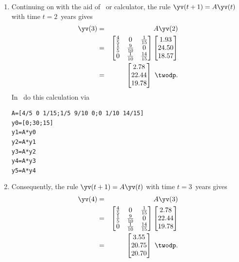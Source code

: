 \begin{example}[orangutans]
\begin{solution}
\begin{enumerate}
\item Continuing on with the aid of \script\ or calculator, the rule \(\yv(t+1)=A\yv(t)\) with time \(t=2\)~years gives
\begin{eqnarray*}
\yv(3)&=&A\yv(2)
\\&=&\begin{bmatrix} \frac45&0&\frac1{15}
\\\frac15&\frac9{10}&0
\\0&\frac1{10}&\frac{14}{15} \end{bmatrix}
\begin{bmatrix} 1.93\\24.50\\18.57 \end{bmatrix}
\\&=&\begin{bmatrix} 2.78\\22.44\\19.78 \end{bmatrix}\ \twodp.
\end{eqnarray*}
In \script\ do this calculation via
\begin{verbatim}
A=[4/5 0 1/15;1/5 9/10 0;0 1/10 14/15]
y0=[0;30;15]
y1=A*y0
y2=A*y1
y3=A*y2
y4=A*y3
y5=A*y4
\end{verbatim}
\setbox\ajrqrbox\hbox{}%
\marginajrbox%

\item Consequently, the rule \(\yv(t+1)=A\yv(t)\) with time \(t=3\)~years gives
\begin{eqnarray*}
\yv(4)&=&A\yv(3)
\\&=&\begin{bmatrix} \frac45&0&\frac1{15}
\\\frac15&\frac9{10}&0
\\0&\frac1{10}&\frac{14}{15} \end{bmatrix}
\begin{bmatrix} 2.78\\22.44\\19.78 \end{bmatrix}
\\&=&\begin{bmatrix} 3.55\\20.75\\20.70 \end{bmatrix}\ \twodp.
\end{eqnarray*}
  

\end{enumerate}
\end{solution}
\end{example}
